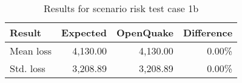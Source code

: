 \begin{table}[htbp]

\centering
\begin{tabular}{ l r r r }

\hline
\rowcolor{anti-flashwhite}
\bf{Result} & \bf{Expected} & \bf{OpenQuake} & \bf{Difference}\\
\hline
Mean loss & 4,130.00 & 4,130.00 & 0.00\% \\
Std. loss & 3,208.89 & 3,208.89 & 0.00\% \\
\hline
\end{tabular}

\caption{Results for scenario risk test case 1b}
\label{tab:result-sr-1b}
\end{table}